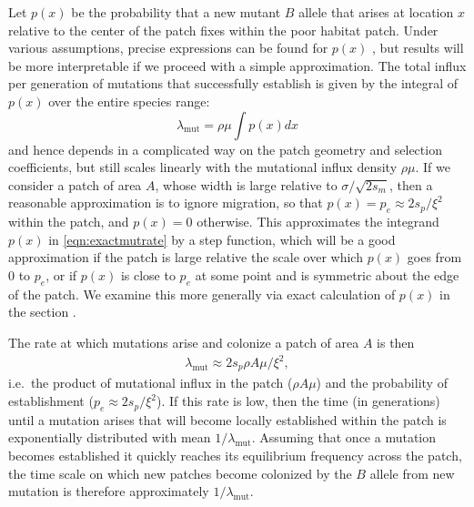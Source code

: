 \documentclass{article}
\newcommand{\linelabel}[1]{}
\newcommand{\citep}[1]{\cite{#1}}
\newcommand{\mutrate}{\lambda_\text{mut}}
\newcommand{\secref}[1]{{\emph{\nameref{#1}}}}
\begin{document}
Let $p(x)$ be the probability that a new mutant $B$ allele that arises at location $x$
relative to the center of the patch fixes within the poor habitat patch.
Under various assumptions, precise expressions can be found for $p(x)$ \citep{barton1987establishment},
but results will be more interpretable if we proceed with a simple approximation.
The total influx per generation of mutations that successfully establish is given by the
integral of $p(x)$ over the entire species range:
\begin{equation}
  \mutrate = \rho \mu \int p(x) dx \label{eqn:exactmutrate}
\end{equation}
and hence depends in a complicated way on the patch geometry and selection coefficients,
but still scales linearly with the mutational influx density $\rho \mu$.
If we consider a patch of area $A$, whose width is large relative to $\sigma/\sqrt{2s_m}$, 
then a reasonable approximation is to ignore migration, 
so that $p(x) = p_e \approx 2 s_p / \xi^2$ within the patch, and $p(x) = 0$ otherwise.
This approximates the integrand $p(x)$ in \eqref{eqn:exactmutrate} by a step function,
which will be a good approximation if the patch is large relative the scale over which $p(x)$ goes from 0 to $p_e$,
or if $p(x)$ is close to $p_e$ at some point and is symmetric about the edge of the patch. \linelabel{rr:p_estab}
We examine this more generally via exact calculation of $p(x)$ in the section \secref{apx:establishment_sims}.

The rate at which mutations arise and colonize a patch of area $A$ is then
\begin{align} \label{eqn:mutrate} 
  \mutrate %
  \approx 2 s_p \rho A \mu / \xi^2,  
\end{align}
i.e.\ the product of mutational influx in the patch ($\rho A\mu$) and the probability of establishment ($p_e \approx 2s_p/\xi^2$).
If this rate is low, then the time (in generations) until a mutation arises that
will become locally established within the patch is exponentially distributed with mean $1/\mutrate$.  
Assuming that once a mutation becomes established it quickly reaches its equilibrium frequency across the patch, 
the time scale on which new patches become colonized by the $B$ allele from new mutation is therefore approximately $1/\mutrate$.
\end{document}
